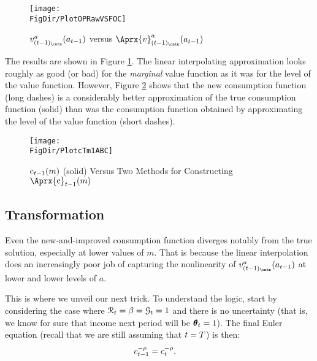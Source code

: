\hypertarget{PlotOPRawVSFOC}{}
\begin{figure}
  \centerline{\texttt{[image: \\FigDir/PlotOPRawVSFOC]}}
  \caption{$\vFunc_{({\prdT-1})_\cntn}^{{a}}({a}_{\prdT-1})$ versus $\Aprx{\vFunc}_{({\prdT-1})_\cntn}^{{a}}({a}_{\prdT-1})$}
  \label{fig:PlotOPRawVSFOC}
\end{figure}


The results are shown in Figure \ref{fig:PlotOPRawVSFOC}.  The linear interpolating approximation looks roughly as good (or bad) for the \textit{marginal} value function as it was for the level of the value function. However, Figure \ref{fig:PlotcTm1ABC} shows that the new consumption function (long dashes) is a considerably better approximation of the true consumption function (solid) than was the consumption function obtained by approximating the level of the value function (short dashes).

\hypertarget{PlotcTm1ABC}{}
\begin{figure}
  \centerline{\texttt{[image: \\FigDir/PlotcTm1ABC]}}
  \caption{$\mathrm{c}_{t-1}(m)$ (solid) Versus Two Methods for Constructing $\Aprx{\cFunc}_{\prdT-1}(\mNrm)$}
  \label{fig:PlotcTm1ABC}
\end{figure}

\hypertarget{transformation}{}
\subsection{Transformation}\label{subsec:transformation}

Even the new-and-improved consumption function diverges notably from the true
solution, especially at lower values of ${m}$.  That is because the
linear interpolation does an increasingly poor job of capturing the
nonlinearity of $\vFunc_{({\prdT-1})_\cntn}^{{a}}({a}_{\prdT-1})$ at
lower and lower levels of ${a}$.

This is where we unveil our next trick.  To understand the logic,
start by considering the case where $\mathcal{R}_{t} = \beta =
\mathcal{G}_{t} = 1$ and there is no uncertainty
(that is, we know for sure that income next period
will be $\pmb{\theta}_{t} = 1$).  The final Euler equation (recall that we are still assuming that $t=T$) is then:
\begin{equation}\begin{gathered}\begin{aligned}
      c_{t-1}^{-\rho}  & = {c}_{t}^{-\rho}.
    \end{aligned}\end{gathered}\end{equation}

